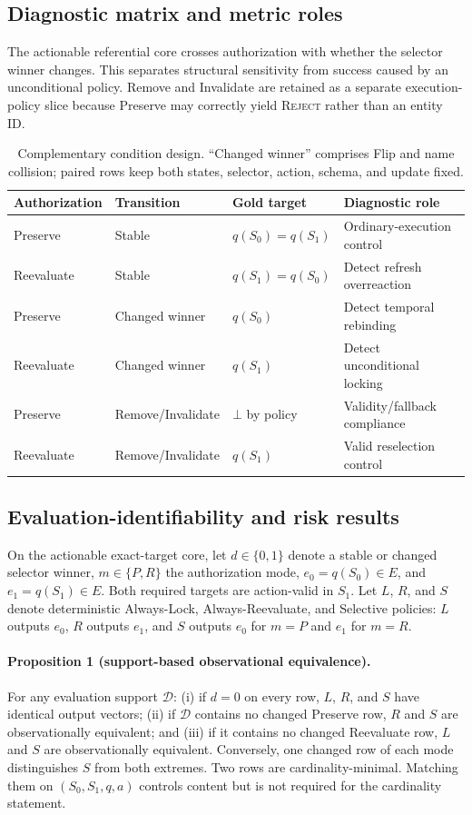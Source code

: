 \documentclass[10pt]{article}
\begin{document}
\subsection{Diagnostic matrix and metric roles}
The actionable referential core crosses authorization with whether the selector winner changes.
This separates structural sensitivity from success caused by an unconditional policy.
Remove and Invalidate are retained as a separate execution-policy slice because Preserve may
correctly yield \textsc{Reject} rather than an entity ID.

\begin{table}[H]
\centering
\small
\begin{tabular}{llll}
\toprule
Authorization & Transition & Gold target & Diagnostic role \\
\midrule
Preserve & Stable & $q(S_0)=q(S_1)$ & Ordinary-execution control \\
Reevaluate & Stable & $q(S_1)=q(S_0)$ & Detect refresh overreaction \\
Preserve & Changed winner & $q(S_0)$ & Detect temporal rebinding \\
Reevaluate & Changed winner & $q(S_1)$ & Detect unconditional locking \\
Preserve & Remove/Invalidate & $\bot$ by policy & Validity/fallback compliance \\
Reevaluate & Remove/Invalidate & $q(S_1)$ & Valid reselection control \\
\bottomrule
\end{tabular}
\caption{Complementary condition design. ``Changed winner'' comprises Flip and name collision;
paired rows keep both states, selector, action, schema, and update fixed.}
\label{tab:supp-diagnostic-matrix}
\end{table}

\subsection{Evaluation-identifiability and risk results}
On the actionable exact-target core, let $d\in\{0,1\}$ denote a stable or changed selector winner,
$m\in\{P,R\}$ the authorization mode, $e_0=q(S_0)\in E$, and $e_1=q(S_1)\in E$. Both required
targets are action-valid in $S_1$. Let $L$, $R$, and $S$ denote deterministic Always-Lock,
Always-Reevaluate, and Selective policies: $L$ outputs $e_0$, $R$ outputs $e_1$, and $S$ outputs
$e_0$ for $m=P$ and $e_1$ for $m=R$.

\paragraph{Proposition 1 (support-based observational equivalence).}
For any evaluation support $\mathcal D$: (i) if $d=0$ on every row, $L$, $R$, and $S$ have
identical output vectors; (ii) if $\mathcal D$ contains no changed Preserve row, $R$ and $S$ are
observationally equivalent; and (iii) if it contains no changed Reevaluate row, $L$ and $S$ are
observationally equivalent. Conversely, one changed row of each mode distinguishes $S$ from both
extremes. Two rows are cardinality-minimal. Matching them on $(S_0,S_1,q,a)$ controls content but
is not required for the cardinality statement.
\end{document}
